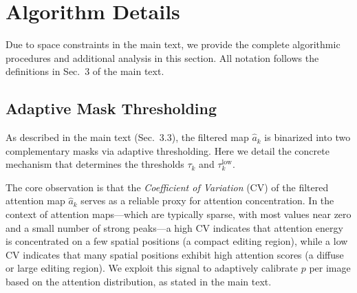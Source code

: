 \section{Algorithm Details}
\label{sec:supp_algorithms}

Due to space constraints in the main text, we provide the complete algorithmic procedures and additional analysis in this section. All notation follows the definitions in Sec.~3 of the main text.

\subsection{Adaptive Mask Thresholding}
\label{sec:supp_adaptive_threshold}

As described in the main text (Sec.~3.3), the filtered map $\hat{a}_k$ is binarized into two complementary masks via adaptive thresholding. Here we detail the concrete mechanism that determines the thresholds $\tau_k$ and $\tau_k^{\mathrm{low}}$.

The core observation is that the \emph{Coefficient of Variation} (CV) of the filtered attention map $\hat{a}_k$ serves as a reliable proxy for attention concentration.
In the context of attention maps---which are typically sparse, with most values near zero and a small number of strong peaks---a high CV indicates that attention energy is concentrated on a few spatial positions (a compact editing region), while a low CV indicates that many spatial positions exhibit high attention scores (a diffuse or large editing region).
We exploit this signal to adaptively calibrate $p$ per image based on the attention distribution, as stated in the main text.

